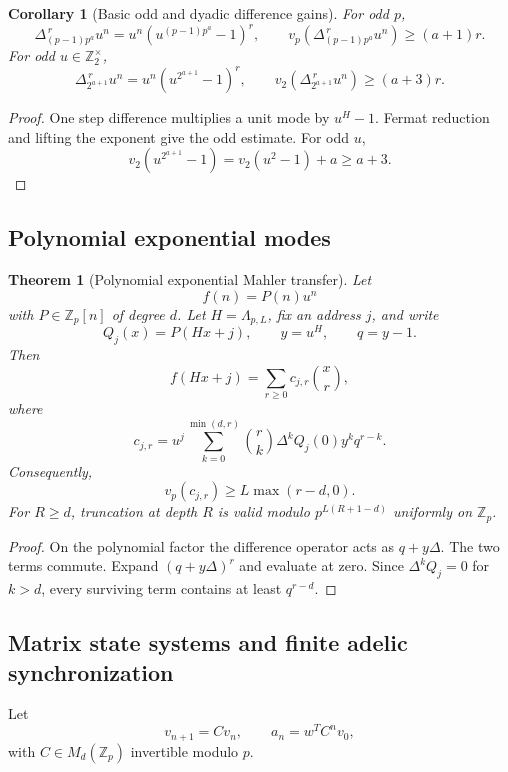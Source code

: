 \documentclass{aomart}
\newtheorem{theorem}{Theorem}[section]
\newtheorem{corollary}[corollary]{Corollary}
\theoremstyle{definition}
\theoremstyle{remark}
\newcommand{\Zp}{\mathbb Z_p}
\newcommand{\vp}{v_p}
\newcommand{\vTwo}{v_2}
\begin{document}
\begin{corollary}[Basic odd and dyadic difference gains]\label{cor:basic_local_difference_gains}
For odd \(p\),
\[
\boxed{
\Delta_{(p-1)p^a}^{\,r}u^n
=
u^n\left(u^{(p-1)p^a}-1\right)^r,
\qquad
\vp\left(\Delta_{(p-1)p^a}^{\,r}u^n\right)\geq(a+1)r.
}
\]
For odd \(u\in\mathbb Z_2^\times\),
\[
\boxed{
\Delta_{2^{a+1}}^{\,r}u^n
=
u^n\left(u^{2^{a+1}}-1\right)^r,
\qquad
\vTwo\left(\Delta_{2^{a+1}}^{\,r}u^n\right)\geq(a+3)r.
}
\]
\end{corollary}

\begin{proof}
One step difference multiplies a unit mode by \(u^H-1\). Fermat reduction and lifting the exponent give the odd estimate. For odd \(u\),
\[
\vTwo\left(u^{2^{a+1}}-1\right)
=
\vTwo(u^2-1)+a
\geq a+3.
\]
\end{proof}

\subsection{Polynomial exponential modes}

\begin{theorem}[Polynomial exponential Mahler transfer]\label{thm:polynomial_exponential_mahler}
Let
\[
f(n)=P(n)u^n
\]
with \(P\in\Zp[n]\) of degree \(d\). Let \(H=\Lambda_{p,L}\), fix an address \(j\), and write
\[
Q_j(x)=P(Hx+j),
\qquad
y=u^H,
\qquad q=y-1.
\]
Then
\[
\boxed{
f(Hx+j)=\sum_{r\geq0}c_{j,r}\binom xr,
}
\]
where
\[
\boxed{
c_{j,r}
=
u^j
\sum_{k=0}^{\min(d,r)}
\binom rk
\Delta^kQ_j(0)y^kq^{r-k}.
}
\]
Consequently,
\[
\boxed{
\vp(c_{j,r})\geq L\max(r-d,0).
}
\]
For \(R\geq d\), truncation at depth \(R\) is valid modulo \(p^{L(R+1-d)}\) uniformly on \(\Zp\).
\end{theorem}

\begin{proof}
On the polynomial factor the difference operator acts as \(q+y\Delta\). The two terms commute. Expand \((q+y\Delta)^r\) and evaluate at zero. Since \(\Delta^kQ_j=0\) for \(k>d\), every surviving term contains at least \(q^{r-d}\).
\end{proof}

\subsection{Matrix state systems and finite adelic synchronization}

Let
\[
v_{n+1}=Cv_n,
\qquad
a_n=w^TC^nv_0,
\]
with \(C\in M_d(\Zp)\) invertible modulo \(p\).
\end{document}
